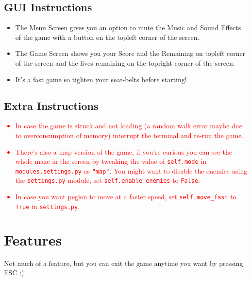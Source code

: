 \documentclass{article}
\begin{document}
\begin{center}
\subsection{GUI Instructions}
\begin{itemize}
    \item The Menu Screen gives you an option to mute the Music and Sound Effects of the game with a button on the topleft corner of the screen.
    \item The Game Screen shows you your Score and the Remaining on topleft corner of the screen and the lives remaining on the topright corner of the screen.
    \item It's a fast game so tighten your seat-belts before starting!
\end{itemize}
\subsection{Extra Instructions}
\textcolor{red}{
    \begin{itemize}
    \item In case the game is struck and not loading (a random walk error maybe due to overconsumption of memory) interrupt the terminal and re-run the game.
    \item There's also a map version of the game, if you're curious you can see the whole maze in the screen by tweaking the value of \texttt{self.mode} in \texttt{modules.settings.py} as \texttt{"map"}. You might want to disable the enemies using the \texttt{settings.py} module, set \texttt{self.enable\_enemies} to \texttt{False}.
    \item In case you want pegion to move at a faster speed, set \texttt{self.move\_fast} to \texttt{True} in \texttt{settings.py}.
\end{itemize}
}
\end{center}
\section{Features}
Not much of a feature, but you can exit the game anytime you want by pressing ESC :)\\
\end{document}
